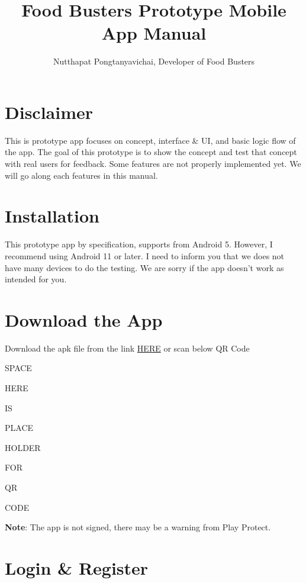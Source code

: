 \documentclass[a4paper,12pt]{article}
\begin{document}
\title{\textbf{Food Busters Prototype Mobile App Manual}}

\author{Nutthapat Pongtanyavichai, Developer of Food Busters}

\maketitle
\tableofcontents

\section{Disclaimer}

This is prototype app focuses on concept, interface \& UI, and basic logic flow of the app.
The goal of this prototype is to show the concept and test that concept with real users for feedback.
Some features are not properly implemented yet.
We will go along each features in this manual.

\section{Installation}

This prototype app by specification, supports from Android 5.
However, I recommend using Android 11 or later.
I need to inform you that we does not have many devices to do the testing.
We are sorry if the app doesn't work as intended for you.

\section{Download the App}

\begin{simplechar}
Download the apk file from the link \href{https://github.com/Food-Busters/food_busters/releases/download/1.0.301/food_busters-1.0.301-arm64-v8a.apk}{HERE} or scan below QR Code
\end{simplechar}

SPACE

HERE

IS

PLACE

HOLDER

FOR

QR

CODE

\textbf{Note}: The app is not signed, there may be a warning from Play Protect.

\section{Login \& Register}
\end{document}
